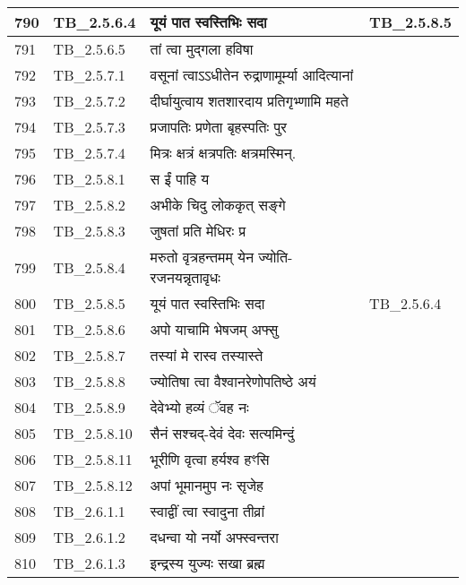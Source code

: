 \documentclass[17pt]{extarticle}
\begin{document}
\begin{longtable}{||p{0.4in}||p{0.9in}||p{4.0in}||p{0.9in}||}
        \hline
            790 & TB\_2.5.6.4 & यूयं पात स्वस्तिभिः सदा &  TB\_2.5.8.5       \\
        \hline
            791 & TB\_2.5.6.5 & तां त्वा मुद्गला हविषा &      \\
        \hline
            792 & TB\_2.5.7.1 & वसूनां त्वाऽऽधीतेन रुद्राणामूर्म्या आदित्यानां &      \\
        \hline
            793 & TB\_2.5.7.2 & दीर्घायुत्वाय शतशारदाय प्रतिगृभ्णामि महते &      \\
        \hline
            794 & TB\_2.5.7.3 & प्रजापतिः प्रणेता बृहस्पतिः पुर &      \\
        \hline
            795 & TB\_2.5.7.4 & मित्रः क्षत्रं क्षत्रपतिः क्षत्रमस्मिन्. &      \\
        \hline
            796 & TB\_2.5.8.1 & स ईं पाहि य &      \\
        \hline
            797 & TB\_2.5.8.2 & अभीके चिदु लोककृत् सङ्गे &      \\
        \hline
            798 & TB\_2.5.8.3 & जुषतां प्रति मेधिरः प्र &      \\
        \hline
            799 & TB\_2.5.8.4 & मरुतो वृत्रहन्तमम् येन ज्योति{-}रजनयन्नृतावृधः &      \\
        \hline
            800 & TB\_2.5.8.5 & यूयं पात स्वस्तिभिः सदा & TB\_2.5.6.4        \\
        \hline
            801 & TB\_2.5.8.6 & अपो याचामि भेषजम् अफ्सु &      \\
        \hline
            802 & TB\_2.5.8.7 & तस्यां मे रास्व तस्यास्ते &      \\
        \hline
            803 & TB\_2.5.8.8 & ज्योतिषा त्वा वैश्वानरेणोपतिष्ठे अयं &      \\
        \hline
            804 & TB\_2.5.8.9 & देवेभ्यो हव्यं ॅवह नः &      \\
        \hline
            805 & TB\_2.5.8.10 & सैनं सश्चद्{-}देवं देवः सत्यमिन्दुं &      \\
        \hline
            806 & TB\_2.5.8.11 & भूरीणि वृत्वा हर्यश्व हꣳसि &      \\
        \hline
            807 & TB\_2.5.8.12 & अपां भूमानमुप नः सृजेह &      \\
        \hline
            808 & TB\_2.6.1.1 & स्वाद्वीं त्वा स्वादुना तीव्रां &      \\
        \hline
            809 & TB\_2.6.1.2 & दधन्वा यो नर्यो अफ्स्वन्तरा &      \\
        \hline
            810 & TB\_2.6.1.3 & इन्द्रस्य युज्यः सखा ब्रह्म &      \\

\end{longtable}
\end{document}
